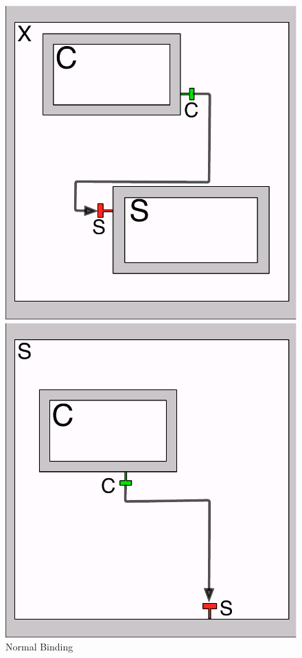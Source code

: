 	\begin{figure}[H]
	\begin{minipage}[b]{0.3\linewidth} 
	\centering
	\includegraphics[width=\textwidth]{figures/chapter2/normalbinding.pdf}
	\caption{Normal Binding}
	\label{fig:normal}
	\end{minipage}
	\hspace{0.25cm}
	\begin{minipage}[b]{0.3\linewidth} 
	\centering
	\includegraphics[width=\textwidth]{figures/chapter2/importbinding.pdf}

\end{minipage}
\end{figure}
